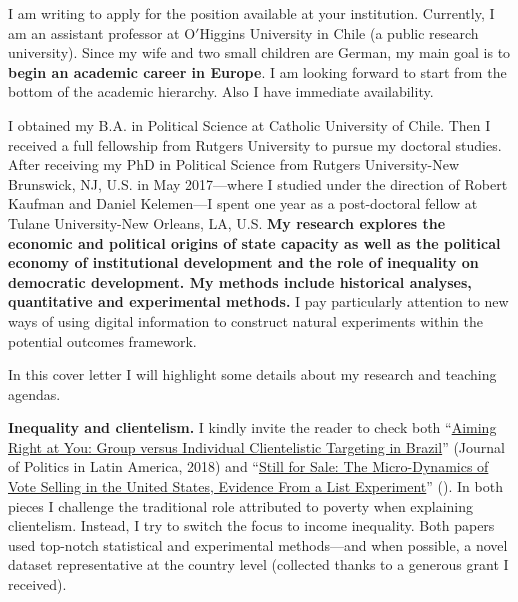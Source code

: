 \vspace{-0.3cm}I am writing to apply for the position available at your institution. Currently, I am an assistant professor at O$'$Higgins University in Chile (a public research university). Since my wife and two small children are German, my main goal is to {\bf begin an academic career in Europe}. I am looking forward to start from the bottom of the academic hierarchy. Also I have immediate availability.

I obtained my B.A. in Political Science at Catholic University of Chile. Then I received a full fellowship from Rutgers University to pursue my doctoral studies. After receiving my PhD in Political Science from Rutgers University-New Brunswick, NJ, U.S. in May 2017---where I studied under the direction of Robert Kaufman and Daniel Kelemen---I spent one year as a post-doctoral fellow at Tulane University-New Orleans, LA, U.S. {\bf My research explores the economic and political origins of state capacity as well as the political economy of institutional development and the role of inequality on democratic development. My methods include historical analyses, quantitative and experimental methods.} I pay particularly attention to new ways of using digital information to construct natural experiments within the potential outcomes framework. 

In this cover letter I will highlight some details about my research and teaching agendas.

{\bf Inequality and clientelism.} I kindly invite the reader to check both ``\href{https://journals.sub.uni-hamburg.de/giga/jpla/article/view/1121/1128}{Aiming Right at You: Group versus Individual Clientelistic Targeting in Brazil}'' (Journal of Politics in Latin America, 2018) and ``\href{https://doi.org/10.1057/s41269-020-00174-4}{Still for Sale: The Micro-Dynamics of Vote Selling in the United States, Evidence From a List Experiment}'' ({\unskip}). In both pieces I challenge the traditional role attributed to poverty when explaining clientelism. Instead, I try to switch the focus to income inequality. Both papers used top-notch statistical and experimental methods---and when possible, a novel dataset representative at the country level (collected thanks to a generous grant I received). 

